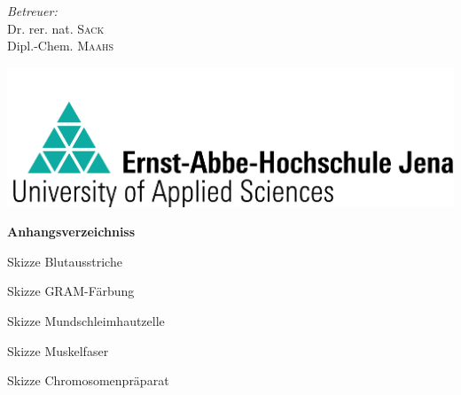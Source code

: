 \begin{titlepage}
\begin{flushleft}
	\end{flushleft}
	\begin{flushleft} \large
		\emph{Betreuer:} \\
		Dr. rer. nat. \textsc{Sack}\\
		Dipl.-Chem. \textsc{Maahs}\\[24pt] %
	\end{flushleft}
	\includegraphics[scale=2] {eahj-logo-511x160.png}\\ %
		
	\vfill %
		
\end{titlepage}

\tableofcontents
\listoftables
\newpage










\newpage

\printbibliography


\Large\textbf{Anhangsverzeichniss}

\HRule



\begin{enumerate}
{\Large
\item[A.] Skizze Blutausstriche
\item[B.] Skizze GRAM-Färbung
\item[C.] Skizze Mundschleimhautzelle
\item[D.] Skizze Muskelfaser
\item[E.] Skizze Chromosomenpräparat
}
\end{enumerate}




